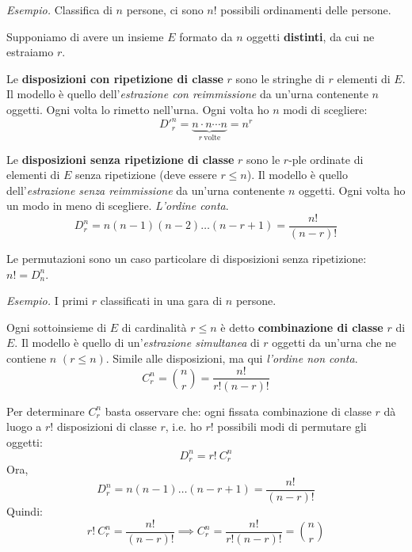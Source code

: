 \textit{Esempio.} Classifica di $n$ persone, ci sono $n!$ possibili ordinamenti delle persone.

Supponiamo di avere un insieme $E$ formato da $n$ oggetti \textbf{distinti}, da cui ne estraiamo $r$.
\begin{definition}
	Le \textbf{disposizioni con ripetizione di classe }$r$ sono le stringhe di $r$ elementi di $E$. Il modello è quello dell'\textit{estrazione con reimmissione} da un'urna contenente $n$ oggetti. Ogni volta lo rimetto nell'urna. Ogni volta ho $n$ modi di scegliere:
	\begin{equation*}
		\boxed{D'^{n}_{r} =\underbrace{n\cdot n\cdots n}_{r\ \text{volte}} =n^{r}}
	\end{equation*}
\end{definition}

\begin{definition}
	Le \textbf{disposizioni senza ripetizione di classe} $r$ sono le $r$-ple ordinate di elementi di $E$ senza ripetizione (deve essere $r\leq n$). Il modello è quello dell'\textit{estrazione senza reimmissione} da un'urna contenente $n$ oggetti. Ogni volta ho un modo in meno di scegliere. \textit{L'ordine conta}.
	\begin{equation*}
		\boxed{D_{r}^{n} =n( n-1)( n-2) \dots ( n-r+1) =\frac{n!}{( n-r) !}}
	\end{equation*}
\end{definition}

\begin{oss}
	Le permutazioni sono un caso particolare di disposizioni senza ripetizione: $n!=D_{n}^{n}$.
\end{oss}

\textit{Esempio.} I primi $r$ classificati in una gara di $n$ persone.

\begin{definition}
	Ogni sottoinsieme di $E$ di cardinalità $r\leq n$ è detto \textbf{combinazione di classe} $r$ di $E$. Il modello è quello di un'\textit{estrazione simultanea} di $r$ oggetti da un'urna che ne contiene $n$ $( r\leq n)$. Simile alle disposizioni, ma qui \textit{l'ordine non conta}.
	\begin{equation*}
		\boxed{C_{r}^{n} =\binom{n}{r} =\frac{n!}{r!( n-r) !}}
	\end{equation*}
\end{definition}

\begin{oss}
Per determinare $C_{r}^{n}$ basta osservare che: ogni fissata combinazione di classe $r$ dà luogo a $r!$ disposizioni di classe $r$, i.e. ho $r!$ possibili modi di permutare gli oggetti:
	\begin{equation*}
		D_{r}^{n} =r!\ C_{r}^{n}
	\end{equation*}
	Ora,
	\begin{equation*}
		D_{r}^{n} =n( n-1) \dots ( n-r+1) =\frac{n!}{( n-r) !}
	\end{equation*}
	Quindi:
	\begin{equation*}
		r!\ C_{r}^{n} =\frac{n!}{( n-r) !} \implies C_{r}^{n} =\frac{n!}{r!( n-r) !} =\binom{n}{r}
	\end{equation*}
\end{oss}

